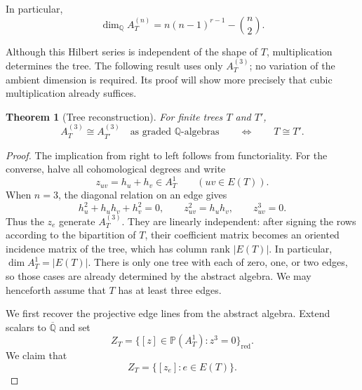 \documentclass[11pt]{amsart}
\theoremstyle{plain}
\newtheorem{theorem}{Theorem}[section]
\theoremstyle{definition}
\theoremstyle{remark}
\newcommand{\Q}{\mathbb{Q}}
\newcommand{\PP}{\mathbb{P}}
\begin{document}
In particular,
\[
  \dim_{\Q}A_T^{(n)}=n(n-1)^{r-1}-\binom n2.
\]

Although this Hilbert series is independent of the shape of $T$, multiplication
determines the tree.  The following result uses only $A_T^{(3)}$; no variation
of the ambient dimension is required.  Its proof will show more precisely that
cubic multiplication already suffices.

\begin{theorem}[Tree reconstruction]\label{thm:tree-reconstruction}
For finite trees $T$ and $T'$,
\[
  A_T^{(3)}\cong A_{T'}^{(3)}
  \quad\text{as graded $\Q$-algebras}
  \qquad\Longleftrightarrow\qquad
  T\cong T'.
\]
\end{theorem}

\begin{proof}
The implication from right to left follows from functoriality.  For the
converse, halve all cohomological degrees and write
\[
  z_{uv}=h_u+h_v\in A_T^1
  \qquad(uv\in E(T)).
\]
When $n=3$, the diagonal relation on an edge gives
\[
  h_u^2+h_uh_v+h_v^2=0,
  \qquad z_{uv}^2=h_uh_v,
  \qquad z_{uv}^3=0.
\]
Thus the $z_e$ generate $A_T^{(3)}$.  They are linearly independent: after
signing the rows according to the bipartition of $T$, their coefficient matrix
becomes an oriented incidence matrix of the tree, which has column rank
$|E(T)|$.  In particular, $\dim A_T^1=|E(T)|$.
There is only one tree with each of zero, one, or two edges, so those cases are
already determined by the abstract algebra.  We may henceforth assume that
$T$ has at least three edges.

We first recover the projective edge lines from the abstract algebra.  Extend
scalars to $\overline{\Q}$ and set
\[
  Z_T=\bigl\{[z]\in\PP(A_T^1):z^3=0\bigr\}_{\mathrm{red}}.
\]
We claim that
\begin{equation}\label{eq:tree-cube-zero-lines}
  Z_T=\bigl\{[z_e]:e\in E(T)\bigr\}.
\end{equation}


\end{proof}
\end{document}

